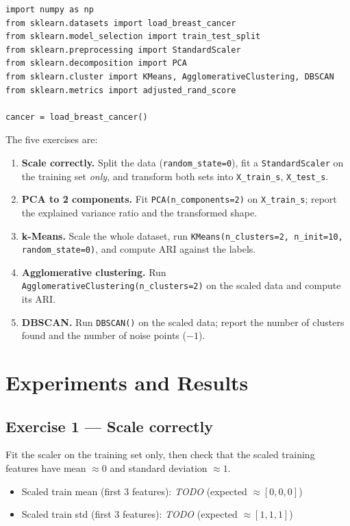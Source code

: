 \documentclass[11pt,a4paper]{article}
\begin{document}
\begin{lstlisting}[caption={Imports and data (Setup).},label={lst:setup}]
import numpy as np
from sklearn.datasets import load_breast_cancer
from sklearn.model_selection import train_test_split
from sklearn.preprocessing import StandardScaler
from sklearn.decomposition import PCA
from sklearn.cluster import KMeans, AgglomerativeClustering, DBSCAN
from sklearn.metrics import adjusted_rand_score

cancer = load_breast_cancer()
\end{lstlisting}

\noindent The five exercises are:
\begin{enumerate}[leftmargin=*]
  \item \textbf{Scale correctly.} Split the data (\lstinline|random_state=0|),
        fit a \lstinline|StandardScaler| on the training set \emph{only}, and
        transform both sets into \lstinline|X_train_s|, \lstinline|X_test_s|.
  \item \textbf{PCA to 2 components.} Fit \lstinline|PCA(n_components=2)| on
        \lstinline|X_train_s|; report the explained variance ratio and the
        transformed shape.
  \item \textbf{k-Means.} Scale the whole dataset, run
        \lstinline|KMeans(n_clusters=2, n_init=10, random_state=0)|, and compute
        ARI against the labels.
  \item \textbf{Agglomerative clustering.} Run
        \lstinline|AgglomerativeClustering(n_clusters=2)| on the scaled data and
        compute its ARI.
  \item \textbf{DBSCAN.} Run \lstinline|DBSCAN()| on the scaled data; report the
        number of clusters found and the number of noise points ($-1$).
\end{enumerate}

\section{Experiments and Results}

\subsection{Exercise 1 — Scale correctly}
Fit the scaler on the training set only, then check that the scaled training
features have mean $\approx 0$ and standard deviation $\approx 1$.
\begin{itemize}[leftmargin=*]
  \item Scaled train mean (first 3 features): \textit{TODO} \quad(expected $\approx[0,0,0]$)
  \item Scaled train std (first 3 features): \textit{TODO} \quad(expected $\approx[1,1,1]$)
\end{itemize}
\end{document}
